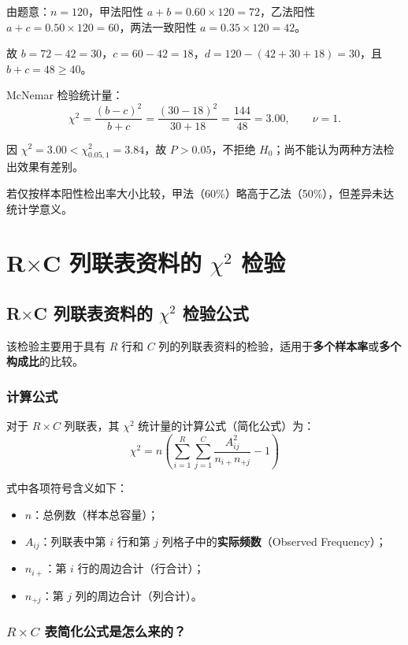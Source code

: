 \documentclass[lang=cn,10pt]{elegantbook}
\begin{document}
\begin{solution}
由题意：$n=120$，甲法阳性 $a+b=0.60\times 120=72$，乙法阳性 $a+c=0.50\times 120=60$，两法一致阳性 $a=0.35\times 120=42$。

故 $b=72-42=30$，$c=60-42=18$，$d=120-(42+30+18)=30$，且 $b+c=48\ge 40$。

McNemar 检验统计量：
\[
\chi^2=\frac{(b-c)^2}{b+c}=\frac{(30-18)^2}{30+18}=\frac{144}{48}=3.00,\qquad \nu=1.
\]

因 $\chi^2=3.00<\chi^2_{0.05,1}=3.84$，故 $P>0.05$，不拒绝 $H_0$；尚不能认为两种方法检出效果有差别。

若仅按样本阳性检出率大小比较，甲法（60\%）略高于乙法（50\%），但差异未达统计学意义。
\end{solution}

\section{R$\times$C 列联表资料的 $\chi^2$ 检验}

\subsection{R$\times$C 列联表资料的 $\chi^2$ 检验公式}

该检验主要用于具有 $R$ 行和 $C$ 列的列联表资料的检验，适用于\textbf{多个样本率}或\textbf{多个构成比}的比较。

\subsubsection{计算公式}
对于 $R \times C$ 列联表，其 $\chi^2$ 统计量的计算公式（简化公式）为：
\begin{equation}
\chi^2 = n \left( \sum_{i=1}^{R} \sum_{j=1}^{C} \frac{A_{ij}^2}{n_{i+} n_{+j}} - 1 \right)
\end{equation}

式中各项符号含义如下：
\begin{itemize}
    \item $n$：总例数（样本总容量）；
    \item $A_{ij}$：列联表中第 $i$ 行和第 $j$ 列格子中的\textbf{实际频数}（Observed Frequency）；
    \item $n_{i+}$：第 $i$ 行的周边合计（行合计）；
    \item $n_{+j}$：第 $j$ 列的周边合计（列合计）。
\end{itemize}

\subsubsection{$R \times C$ 表简化公式是怎么来的？}
\end{document}
